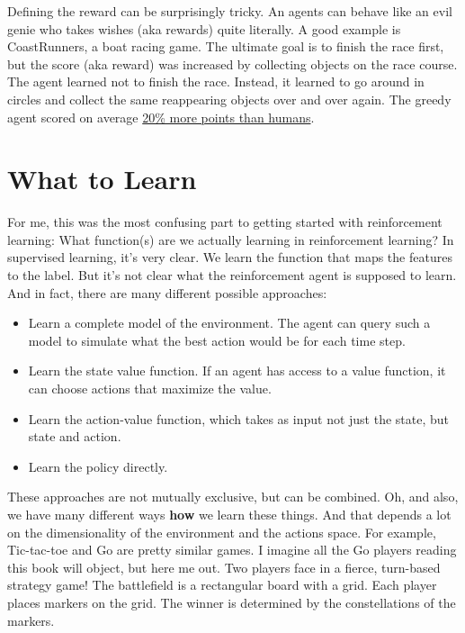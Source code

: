 \documentclass[
  10pt,
]{scrbook}
\providecommand{\tightlist}{%
  \setlength{\itemsep}{0pt}\setlength{\parskip}{0pt}}
\begin{document}
Defining the reward can be surprisingly tricky.
An agents can behave like an evil genie who takes wishes (aka rewards) quite literally.
A good example is CoastRunners, a boat racing game.
The ultimate goal is to finish the race first, but the score (aka reward) was increased by collecting objects on the race course.
The agent learned not to finish the race.
Instead, it learned to go around in circles and collect the same reappearing objects over and over again.
The greedy agent scored on average \href{https://openai.com/blog/faulty-reward-functions/}{20\% more points than humans}.

\hypertarget{what-to-learn}{%
\section{What to Learn}\label{what-to-learn}}

For me, this was the most confusing part to getting started with reinforcement learning:
What function(s) are we actually learning in reinforcement learning?
In supervised learning, it's very clear.
We learn the function that maps the features to the label.
But it's not clear what the reinforcement agent is supposed to learn.
And in fact, there are many different possible approaches:

\begin{itemize}
\tightlist
\item
  Learn a complete model of the environment. The agent can query such a model to simulate what the best action would be for each time step.
\item
  Learn the state value function. If an agent has access to a value function, it can choose actions that maximize the value.
\item
  Learn the action-value function, which takes as input not just the state, but state and action.
\item
  Learn the policy directly.
\end{itemize}

These approaches are not mutually exclusive, but can be combined.
Oh, and also, we have many different ways \textbf{how} we learn these things.
And that depends a lot on the dimensionality of the environment and the actions space.
For example, Tic-tac-toe and Go are pretty similar games.
I imagine all the Go players reading this book will object, but here me out.
Two players face in a fierce, turn-based strategy game!
The battlefield is a rectangular board with a grid.
Each player places markers on the grid.
The winner is determined by the constellations of the markers.
\end{document}
